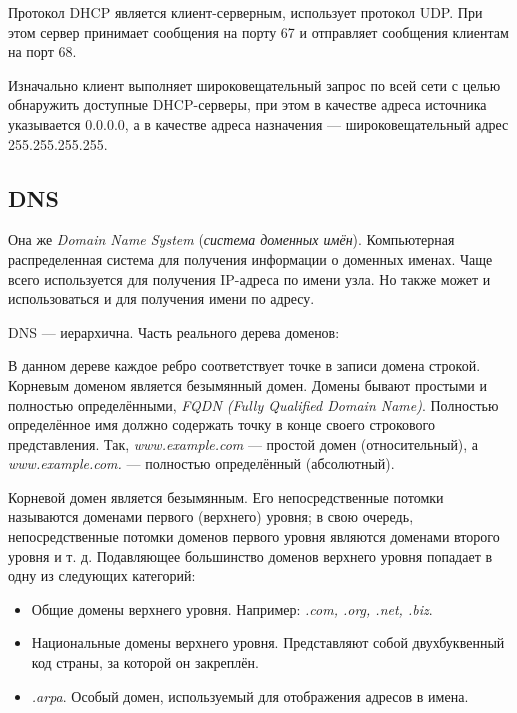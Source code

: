 Протокол DHCP является клиент-серверным, использует протокол UDP. При этом сервер принимает сообщения на порту 67 и отправляет сообщения клиентам на порт 68.

Изначально клиент выполняет широковещательный запрос по всей сети с целью обнаружить доступные DHCP-серверы, при этом в качестве адреса источника указывается 0.0.0.0, а в качестве адреса назначения --- широковещательный адрес 255.255.255.255.

\subsection{DNS}
Она же \emph{Domain Name System} (\emph{система доменных имён}). Компьютерная распределенная система для получения информации о доменных именах. Чаще всего используется для получения IP-адреса по имени узла. Но также может и использоваться и для получения имени по адресу.

DNS — иерархична. Часть реального дерева доменов:
\begin{center}
\end{center}

В данном дереве каждое ребро соответствует точке в записи домена строкой. Корневым доменом является безымянный домен. Домены бывают простыми и полностью определёнными, \emph{FQDN (Fully Qualified Domain Name)}. Полностью определённое имя должно содержать точку в конце своего строкового представления. Так, \emph{www.example.com} — простой домен (относительный), а \emph{www.example.com.} — полностью определённый (абсолютный).

Корневой домен является безымянным. Его непосредственные потомки называются доменами первого (верхнего) уровня; в свою очередь, непосредственные потомки доменов первого уровня являются доменами второго уровня и т. д. Подавляющее большинство доменов верхнего уровня попадает в одну из следующих категорий:
\begin{itemize}
  \item Общие домены верхнего уровня. Например: \emph{.com, .org, .net, .biz}.
  \item Национальные домены верхнего уровня. Представляют собой двухбуквенный код страны, за которой он закреплён.
  \item \emph{.arpa}. Особый домен, используемый для отображения адресов в имена.
\end{itemize}

